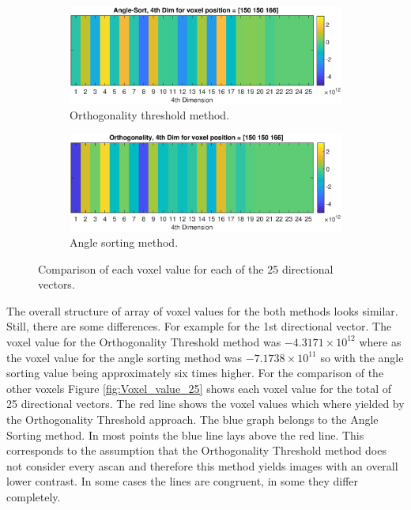 \begin{figure}[H]
     \centering
     \begin{subfigure}[b]{0.85\textwidth}
         \centering
        \includegraphics[width=1.12\linewidth,right]{Graphics/Results/Diff_angle_sort_orthogonality/diff_ortho_bubble_25dim_150150150_ortho.eps}
         \caption{Orthogonality threshold method.}
         \label{fig:res:25_voxel_values_diff_bubble_ortho_image_ortho}
     \end{subfigure}
     \hfill
     \begin{subfigure}[b]{0.85\textwidth}
         \centering
         \includegraphics[width=1.12\textwidth,right]{Graphics/Results/Diff_angle_sort_orthogonality/diff_ortho_bubble_25dim_150150150_sort.eps}
         \caption{Angle sorting method.}
         \label{fig:res:25_voxel_values_diff_bubble_ortho_image_bubble}
     \end{subfigure}
        \caption{Comparison of each voxel value for each of the 25 directional vectors.}
        \label{fig:res:25_voxel_values_diff_bubble_ortho_image}
\end{figure}

The overall structure of array of voxel values for the both methods looks similar. Still, there are some differences. For example for the 1st directional vector. The voxel value for the Orthogonality Threshold method was $-4.3171 \times 10^{12}$  where as the voxel value for the angle sorting method was $-7.1738\times10^{11}$ so with the angle sorting value being approximately six times higher. For the comparison of the other voxels Figure \ref{fig:Voxel_value_25} shows each voxel value for the total of 25 directional vectors. The red line shows the voxel values which where yielded by the Orthogonality Threshold approach. The blue graph belongs to the Angle Sorting method. In most points the blue line lays above the red line. This corresponds to the assumption that the Orthogonality Threshold method does not consider every \ac{ascan} and therefore this method yields images with an overall lower contrast. In some cases the lines are congruent, in some they differ completely.  




